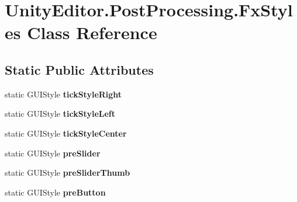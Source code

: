 \hypertarget{class_unity_editor_1_1_post_processing_1_1_fx_styles}{}\section{Unity\+Editor.\+Post\+Processing.\+Fx\+Styles Class Reference}
\label{class_unity_editor_1_1_post_processing_1_1_fx_styles}
\subsection*{Static Public Attributes}
\begin{DoxyCompactItemize}
\item 
\mbox{\label{class_unity_editor_1_1_post_processing_1_1_fx_styles_a15070473bbab7c5b0b85507f4256d6b1}} 
static G\+U\+I\+Style {\bfseries tick\+Style\+Right}
\item 
\mbox{\label{class_unity_editor_1_1_post_processing_1_1_fx_styles_a29e67823f34d7387085022a3190d31ba}} 
static G\+U\+I\+Style {\bfseries tick\+Style\+Left}
\item 
\mbox{\label{class_unity_editor_1_1_post_processing_1_1_fx_styles_a94ab70715f1d6dfdc1e3ecab4cb00d4c}} 
static G\+U\+I\+Style {\bfseries tick\+Style\+Center}
\item 
\mbox{\label{class_unity_editor_1_1_post_processing_1_1_fx_styles_ada2f2e4f216dd8ce5a5013547ce26e4b}} 
static G\+U\+I\+Style {\bfseries pre\+Slider}
\item 
\mbox{\label{class_unity_editor_1_1_post_processing_1_1_fx_styles_a1472e0dc18ea430fdb04d1f6f57e4d7b}} 
static G\+U\+I\+Style {\bfseries pre\+Slider\+Thumb}
\item 
\mbox{\label{class_unity_editor_1_1_post_processing_1_1_fx_styles_a5302a15f3199c5bc1633e5ea1ee02b2d}} 
static G\+U\+I\+Style {\bfseries pre\+Button}
\item 
\mbox{\label{class_unity_editor_1_1_post_processing_1_1_fx_styles_ae95ee5f68bd8890dec3ea6f4bb88b20a}} 

\end{DoxyCompactItemize}
